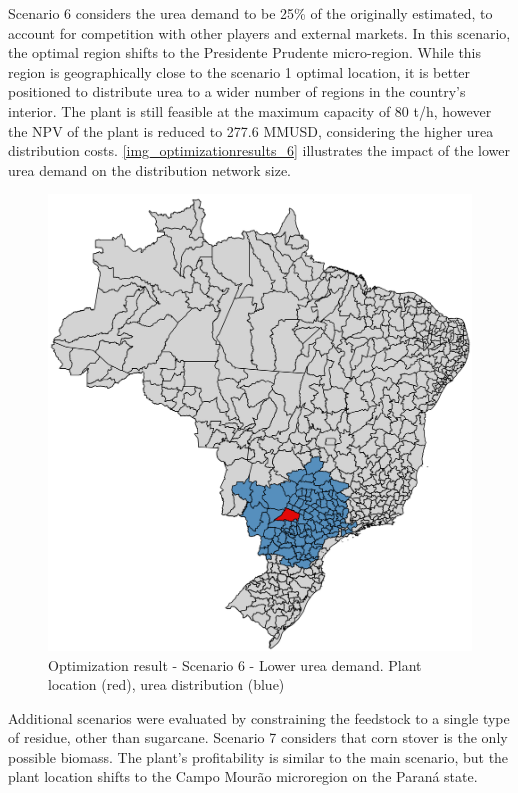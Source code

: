 \documentclass[a4paper, titlepage]{article}
\begin{document}
Scenario 6 considers the urea demand to be 25\% of the originally estimated, to account for competition with other
players and external markets. In this scenario, the optimal region shifts to the Presidente Prudente micro-region. While
this region is geographically close to the scenario 1 optimal location, it is better positioned to distribute urea to a
wider number of regions in the country's interior. The plant is still feasible at the maximum capacity of 80 t/h,
however the NPV of the plant is reduced to 277.6 MMUSD, considering the higher urea distribution costs.
\autoref{img_optimizationresults_6} illustrates the impact of the lower urea demand on the distribution network size.

\begin{figure}[htb]
    \includegraphics[width=\textwidth]{img/optimization_result_6.png}
    \caption{Optimization result - Scenario 6 - Lower urea demand. Plant location (red), urea distribution (blue)}
    \label{img_optimizationresults_6}
\end{figure}

Additional scenarios were evaluated by constraining the feedstock to a single type of residue, other than sugarcane.
Scenario 7 considers that corn stover is the only possible biomass. The plant's profitability is similar to the main scenario,
but the plant location shifts to the Campo Mourão microregion on the Paraná state.
\end{document}
